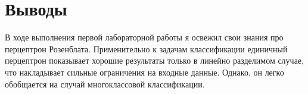 \section{Выводы}
В ходе выполнения первой лабораторной работы я освежил свои знания про перцептрон Розенблата. Применительно к задачам классификации единичный перцептрон показывает хорошие результаты только в линейно разделимом случае, что накладывает сильные ограничения на входные данные. Однако, он легко обобщается на случай многоклассовой классификации.
\pagebreak
